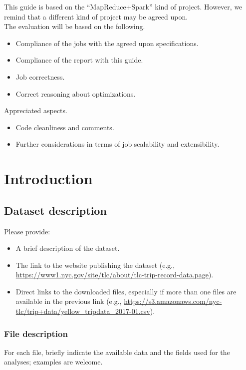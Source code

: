 \documentclass[10pt]{article}
\begin{document}
This guide is based on the ``MapReduce+Spark'' kind of project. However, we remind that a different kind of project may be agreed upon.
\\

The evaluation will be based on the following.
\begin{itemize}
\item Compliance of the jobs with the agreed upon specifications.
\item Compliance of the report with this guide.
\item Job correctness.
\item Correct reasoning about optimizations.
\end{itemize}

Appreciated aspects.
\begin{itemize}
\item Code cleanliness and comments.
\item Further considerations in terms of job scalability and extensibility.
\end{itemize}



\section{Introduction}
\subsection{Dataset description}

Please provide:
\begin{itemize}
\item A brief description of the dataset.
\item The link to the website publishing the dataset (e.g., \url{https://www1.nyc.gov/site/tlc/about/tlc-trip-record-data.page}).
\item Direct links to the downloaded files, especially if more than one files are available in the previous link (e.g., \url{https://s3.amazonaws.com/nyc-tlc/trip+data/yellow_tripdata_2017-01.csv}).
\end{itemize}

\subsubsection{File description}

For each file, briefly indicate the available data and the fields used for the analyses; examples are welcome.
\end{document}

